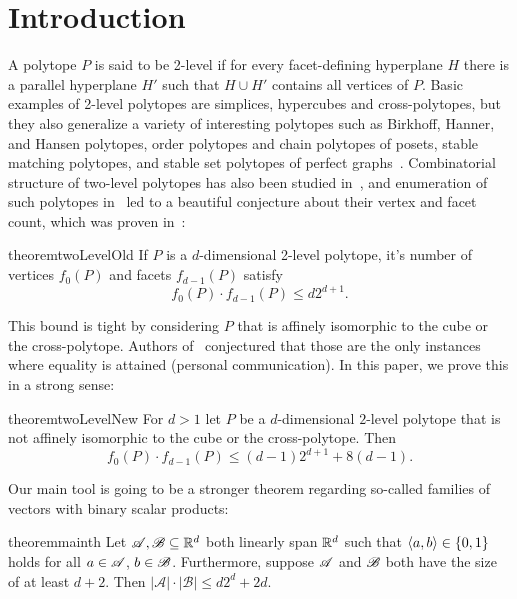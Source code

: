 \section{Introduction}

A polytope $P$ is said to be 2-level if for every facet-defining hyperplane $H$ there is a parallel hyperplane $H'$ such that $H \cup H'$ contains all vertices of $P$. Basic examples of 2-level polytopes are simplices, hypercubes and cross-polytopes, but they also generalize a variety of interesting polytopes such as Birkhoff, Hanner, and Hansen polytopes, order polytopes and chain polytopes of posets, stable matching polytopes, and stable set polytopes of perfect graphs~\cite{aprile18}. Combinatorial structure of two-level polytopes has also been studied in~\cite{fiorini16}, and enumeration of such polytopes in~\cite{bohn18} led to a beautiful conjecture about their vertex and facet count, which was proven in~\cite{kupavskii22}:
\begin{restatable}{theorem}{twoLevelOld}
    \label{two_level_old_bound}
    If $P$ is a $d$-dimensional 2-level polytope, it's number of vertices $f_0(P)$ and facets $f_{d-1}(P)$ satisfy
    \[
        f_0(P) \cdot f_{d-1}(P) \leq d 2^{d+1}.
    \]
\end{restatable}
\noindent This bound is tight by considering $P$ that is affinely isomorphic to the cube or the cross-polytope. Authors of~\cite{bohn18} conjectured that those are the only instances where equality is attained (personal communication). In this paper, we prove this in a strong sense:

\begin{restatable}{theorem}{twoLevelNew}
    \label{two_level_new_bound}
    For $d>1$ let $P$ be a $d$-dimensional $2$-level polytope that is not affinely isomorphic to the cube or the cross-polytope. Then 
    \[
        f_0(P) \cdot f_{d-1}(P) \leq \left(d-1\right) 2^{d+1} + 8\left(d-1\right).
    \]
\end{restatable}

\noindent Our main tool is going to be a stronger theorem regarding so-called families of vectors with binary scalar products:

\begin{restatable}[]{theorem}{mainth}\label{d2d_plus_2d}
     Let ${\mathscr{A}},{\mathscr{B}} \subseteq {\mathbb{R}}^d$ both linearly span ${\mathbb{R}}^d$ such that $\langle a, b\rangle \in \{0,1\}$ holds for all $a \in {\mathscr{A}}$, $b \in {\mathscr{B}}$. Furthermore, suppose ${\mathscr{A}}$ and ${\mathscr{B}}$ both have the size of at least $d+2$. Then $\left|\mathcal{A}\right| \cdot\left|\mathcal{B}\right| \leq d 2^d + 2d$.
\end{restatable}

